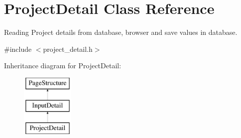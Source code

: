 \hypertarget{classProjectDetail}{\section{Project\-Detail Class Reference}
\label{classProjectDetail}
}


Reading Project details from database, browser and save values in database.  




{\ttfamily \#include $<$project\-\_\-detail.\-h$>$}

Inheritance diagram for Project\-Detail\-:\begin{figure}[H]
\begin{center}
\leavevmode
\includegraphics[height=3.000000cm]{classProjectDetail}
\end{center}
\end{figure}
